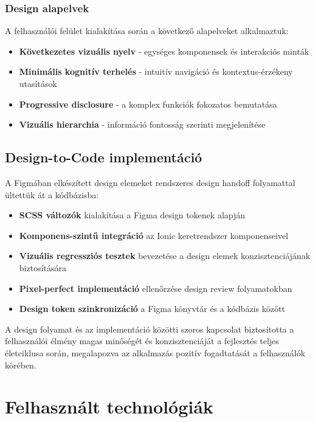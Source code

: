 \documentclass[12pt]{report}
\begin{document}
\subsubsection{Design alapelvek}
A felhasználói felület kialakítása során a következő alapelveket alkalmaztuk:
\begin{itemize}
    \item \textbf{Következetes vizuális nyelv} - egységes komponensek és interakciós minták
    \item \textbf{Minimális kognitív terhelés} - intuitív navigáció és kontextus-érzékeny utasítások
    \item \textbf{Progressive disclosure} - a komplex funkciók fokozatos bemutatása
    \item \textbf{Vizuális hierarchia} - információ fontosság szerinti megjelenítése
\end{itemize}

\subsection{Design-to-Code implementáció}
A Figmában elkészített design elemeket rendszeres design handoff folyamattal ültettük át a kódbázisba:
\begin{itemize}
    \item \textbf{SCSS változók} kialakítása a Figma design tokenek alapján
    \item \textbf{Komponens-szintű integráció} az Ionic keretrendszer komponenseivel
    \item \textbf{Vizuális regressziós tesztek} bevezetése a design elemek konzisztenciájának biztosítására
    \item \textbf{Pixel-perfect implementáció} ellenőrzése design review folyamatokban
    \item \textbf{Design token szinkronizáció} a Figma könyvtár és a kódbázis között
\end{itemize}

A design folyamat és az implementáció közötti szoros kapcsolat biztosította a felhasználói élmény magas minőségét és konzisztenciáját a fejlesztés teljes életciklusa során, megalapozva az alkalmazás pozitív fogadtatását a felhasználók körében.

\section{Felhasznált technológiák}
\end{document}
